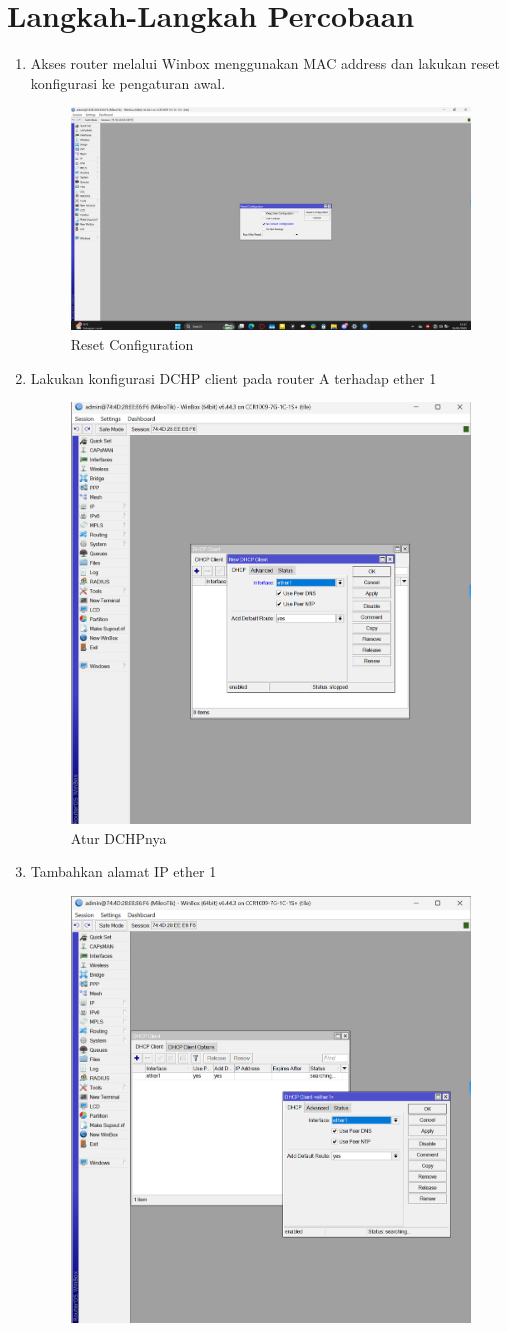 
\section{Langkah-Langkah Percobaan}


\begin{enumerate}

    \item Akses router melalui Winbox menggunakan MAC address dan lakukan reset konfigurasi ke pengaturan awal.
      \begin{figure}[H]
        \centering
        \includegraphics[width=0.5\linewidth]{P1/img/2.png}
        \caption{Reset Configuration}
        \label{fig:gambar4}
    \end{figure}
    \item Lakukan konfigurasi DCHP client pada router A terhadap ether 1
     \begin{figure}[H]
        \centering
        \includegraphics[width=0.5\linewidth]{P1/img/3.png}
        \caption{Atur DCHPnya}
        \label{fig:gambar4}
    \end{figure}
    \item Tambahkan alamat IP ether 1
     \begin{figure}[H]
        \centering
        \includegraphics[width=0.5\linewidth]{P1/img/4.png}

\end{figure}
\end{enumerate}
